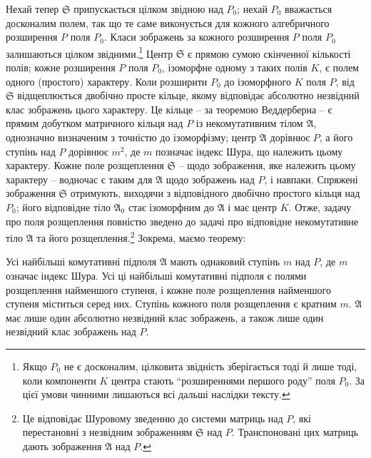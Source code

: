 \documentclass[11pt]{article}
\newcommand{\mS}{\mathfrak{S}}
\newcommand{\mA}{\mathfrak{A}}
\begin{document}
\noindent Нехай тепер $\mS$ припускається цілком звідною над $P_0$; нехай $P_0$ вважається досконалим полем, так що те саме виконується для кожного алгебричного розширення $P$ поля $P_0$. Класи зображень за кожного розширення $P$ поля $P_0$ залишаються цілком звідними.\footnote{Якщо $P_0$ не є досконалим, цілковита звідність зберігається тоді й лише тоді, коли компоненти $K$ центра стають “розширеннями першого роду” поля $P_0$. За цієї умови чинними лишаються всі дальші наслідки тексту.} Центр $\mS$ є прямою сумою скінченної кількості полів; кожне розширення $P$ поля $P_0$, ізоморфне одному з таких полів $K$, є полем одного (простого) характеру. Коли розширити $P_0$ до ізоморфного $K$ поля $P$, від $\mS$ відщеплюється двобічно просте кільце, якому відповідає абсолютно незвідний клас зображень цього характеру. Це кільце -- за теоремою Веддерберна -- є прямим добутком матричного кільця над $P$ із некомутативним тілом $\mA$, однозначно визначеним з точністю до ізоморфізму; центр $\mA$ дорівнює $P$, а його ступінь над $P$ дорівнює $m^2$, де $m$ позначає індекс Шура, що належить цьому характеру. Кожне поле розщеплення $\mS$ -- щодо зображення, яке належить цьому характеру -- водночас є таким для $\mA$ щодо зображень над $P$, і навпаки. Спряжені зображення $\mS$ отримують, виходячи з відповідного двобічно простого кільця над $P_0$; його відповідне тіло $\mA_0$ стає ізоморфним до $\mA$ і має центр $K$. Отже, задачу про поля розщеплення повністю зведено до задачі про відповідне некомутативне тіло $\mA$ та його розщеплення.\footnote{Це відповідає Шуровому зведенню до системи матриць над $P$, які перестановні з незвідним зображенням $\mS$ над $P$. Транспоновані цих матриць дають зображення $\mA$ над $P$.} Зокрема, маємо теорему:

\medskip

\noindent Усі найбільші комутативні підполя $\mA$ мають однаковий ступінь $m$ над $P$, де $m$ означає індекс Шура. Усі ці найбільші комутативні підполя є полями розщеплення найменшого ступеня, і кожне поле розщеплення найменшого ступеня міститься серед них. Ступінь кожного поля розщеплення є кратним $m$. $\mA$ має лише один абсолютно незвідний клас зображень, а також лише один незвідний клас зображень над $P$.
\end{document}
